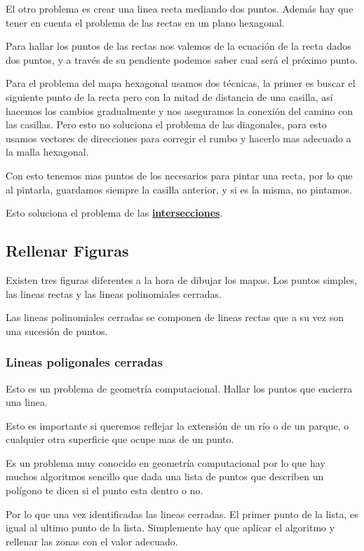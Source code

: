 El otro problema es crear una linea recta mediando dos puntos.
Además hay que tener en cuenta el problema de las rectas en un plano hexagonal.

Para hallar los puntos de las rectas nos valemos de la ecuación de la recta
dados dos puntos, y a través de su pendiente podemos saber cual será el próximo
punto.

Para el problema del mapa hexagonal usamos dos técnicas, la primer es buscar el
siguiente punto de la recta pero con la mitad de distancia de una casilla, así
hacemos los cambios gradualmente y nos aseguramos la conexión del camino con
las casillas.
Pero esto no soluciona el problema de las diagonales, para esto usamos vectores
de direcciones para corregir el rumbo y hacerlo mas adecuado a la malla
hexagonal.

Con esto tenemos mas puntos de los necesarios para pintar una recta, por lo que
al pintarla, guardamos siempre la casilla anterior, y si es la misma, no
pintamos. 

Esto soluciona el problema de las \hyperref[Intersecciones]
{\bf intersecciones}.
\subsection*{Rellenar Figuras}
Existen tres figuras diferentes a la hora de dibujar los mapas.
Los puntos simples, las lineas rectas y las lineas polinomiales cerradas.

Las lineas polinomiales cerradas se componen de lineas rectas que a su vez son
una sucesión de puntos.

\subsubsection*{Lineas poligonales cerradas}
Esto es un problema de geometría computacional. Hallar los puntos que encierra
una linea.

Esto es importante si queremos reflejar la extensión de un río o de un parque,
o cualquier otra superficie que ocupe mas de un punto.

Es un problema muy conocido en geometría computacional por lo que hay muchos
algoritmos sencillo que dada una lista de
puntos que describen un polígono te dicen si el punto esta dentro o no.

Por lo que una vez identificadas las lineas cerradas. El primer punto de la
lista, es igual al ultimo punto de la lista. Simplemente hay que aplicar el
algoritmo y rellenar las zonas con el valor adecuado.
